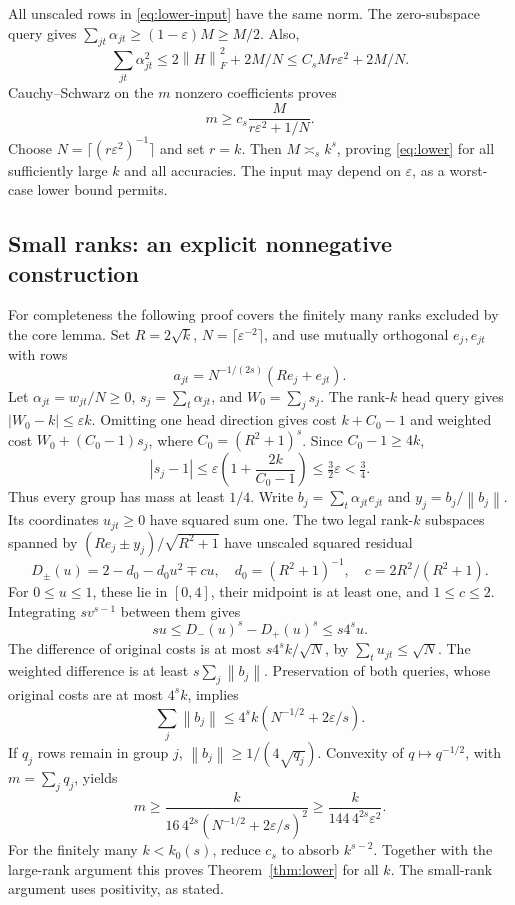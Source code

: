 \documentclass[11pt]{article}
\theoremstyle{remark}\newtheorem{remark}[theorem]{Remark}
\newcommand{\eps}{\varepsilon}\newcommand{\Sym}{\operatorname{Sym}}
\newcommand{\norm}[1]{\left\|#1\right\|}\newcommand{\ip}[2]{\left\langle #1,#2\right\rangle}
\begin{document}
All unscaled rows in \eqref{eq:lower-input} have the same norm. The zero-subspace query gives $\sum_{jt}\alpha_{jt}\ge(1-\eps)M\ge M/2$. Also,
\[
 \sum_{jt}\alpha_{jt}^2\le2\norm H_F^2+2M/N\le C_sMr\eps^2+2M/N.
\]
Cauchy--Schwarz on the $m$ nonzero coefficients proves
\begin{equation}\label{eq:finite-lower}
 m\ge c_s\frac{M}{r\eps^2+1/N}.
\end{equation}
Choose $N=\lceil(r\eps^2)^{-1}\rceil$ and set $r=k$. Then $M\asymp_s k^s$, proving \eqref{eq:lower} for all sufficiently large $k$ and all accuracies. The input may depend on $\eps$, as a worst-case lower bound permits.

\subsection{Small ranks: an explicit nonnegative construction}
For completeness the following proof covers the finitely many ranks excluded by the core lemma. Set $R=2\sqrt k$, $N=\lceil\eps^{-2}\rceil$, and use mutually orthogonal $e_j,e_{jt}$ with rows
\[
 a_{jt}=N^{-1/(2s)}(Re_j+e_{jt}).
\]
Let $\alpha_{jt}=w_{jt}/N\ge0$, $s_j=\sum_t\alpha_{jt}$, and $W_0=\sum_j s_j$. The rank-$k$ head query gives $|W_0-k|\le\eps k$. Omitting one head direction gives cost $k+C_0-1$ and weighted cost $W_0+(C_0-1)s_j$, where $C_0=(R^2+1)^s$. Since $C_0-1\ge4k$,
\[
 |s_j-1|\le\eps\left(1+\frac{2k}{C_0-1}\right)\le\tfrac32\eps<\tfrac34.
\]
Thus every group has mass at least $1/4$. Write $b_j=\sum_t\alpha_{jt}e_{jt}$ and $y_j=b_j/\norm{b_j}$. Its coordinates $u_{jt}\ge0$ have squared sum one. The two legal rank-$k$ subspaces spanned by $(Re_j\pm y_j)/\sqrt{R^2+1}$ have unscaled squared residual
\[
 D_\pm(u)=2-d_0-d_0u^2\mp cu,\quad d_0=(R^2+1)^{-1},\quad c=2R^2/(R^2+1).
\]
For $0\le u\le1$, these lie in $[0,4]$, their midpoint is at least one, and $1\le c\le2$. Integrating $sv^{s-1}$ between them gives
\[
 su\le D_-(u)^s-D_+(u)^s\le s4^su.
\]
The difference of original costs is at most $s4^s k/\sqrt N$, by $\sum_tu_{jt}\le\sqrt N$. The weighted difference is at least $s\sum_j\norm{b_j}$. Preservation of both queries, whose original costs are at most $4^s k$, implies
\[
 \sum_j\norm{b_j}\le4^s k(N^{-1/2}+2\eps/s).
\]
If $q_j$ rows remain in group $j$, $\norm{b_j}\ge1/(4\sqrt{q_j})$. Convexity of $q\mapsto q^{-1/2}$, with $m=\sum_jq_j$, yields
\[
 m\ge\frac{k}{16\,4^{2s}(N^{-1/2}+2\eps/s)^2}
 \ge\frac{k}{144\,4^{2s}\eps^2}.
\]
For the finitely many $k<k_0(s)$, reduce $c_s$ to absorb $k^{s-2}$. Together with the large-rank argument this proves Theorem~\ref{thm:lower} for all $k$. The small-rank argument uses positivity, as stated.
\end{document}
